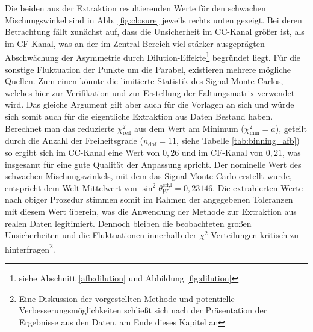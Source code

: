 Die beiden aus der Extraktion resultierenden Werte für den schwachen
Mischungswinkel sind in Abb. \ref{fig:closure} jeweils rechts unten gezeigt.
Bei deren Betrachtung fällt zunächst auf, dass die Unsicherheit im
\ac{CC}-Kanal größer ist, als im \ac{CF}-Kanal, was an der im Zentral-Bereich
viel stärker ausgeprägten Abschwächung der Asymmetrie durch
Dilution-Effekte\footnote{siehe Abschnitt \ref{afb:dilution} und Abbildung
\ref{fig:dilution}} begründet liegt. Für die sonstige Fluktuation der Punkte um
die Parabel, existieren mehrere mögliche Quellen. Zum einen könnte die
limitierte Statistik des Signal Monte-Carlos, welches hier zur Verifikation und
zur Erstellung der Faltungsmatrix verwendet wird. Das gleiche Argument gilt
aber auch für die Vorlagen an sich und würde sich somit auch für die
eigentliche Extraktion aus Daten Bestand haben. Berechnet man das reduzierte
$\chi^2_\text{red}$ aus dem Wert am Minimum ($\chi^2_\text{min} = a$), geteilt
durch die Anzahl der Freiheitsgrade ($n_\text{dof} = 11$, siehe Tabelle
\ref{tab:binning_afb}) so ergibt sich im \ac{CC}-Kanal eine Wert von $0,26$
und im \ac{CF}-Kanal von $0,21$, was insgesamt für eine gute Qualität der
Anpassung spricht. Der nominelle Wert des schwachen Mischungswinkels, mit dem
das Signal Monte-Carlo erstellt wurde, entspricht dem Welt-Mittelwert von
$\sin^2\theta_W^\text{eff,l}=0,23146$. Die extrahierten Werte nach obiger
Prozedur stimmen somit im Rahmen der angegebenen Toleranzen mit diesem Wert
überein, was die Anwendung der Methode zur Extraktion aus realen Daten
legitimiert. Dennoch bleiben die beobachteten großen Unsicherheiten und die
Fluktuationen innerhalb der $\chi^2$-Verteilungen kritisch zu
hinterfragen\footnote{Eine Diskussion der vorgestellten Methode und potentielle
Verbesserungsmöglichkeiten schließt sich nach der Präsentation der Ergebnisse
aus den Daten, am Ende dieses Kapitel an}.

